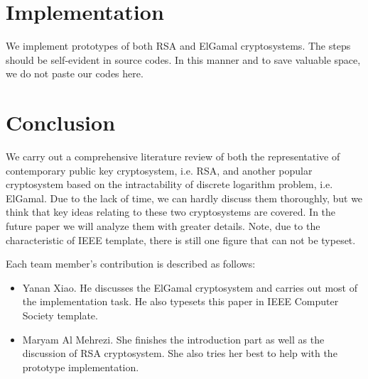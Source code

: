 \documentclass[12pt,journal,compsoc]{IEEEtran}
\begin{document}







\section{Implementation}
\label{sec:implementation}
We implement prototypes of both RSA and ElGamal cryptosystems. The
steps should be self-evident in source codes. In this manner and to
save valuable space, we do not paste our codes here.






\section{Conclusion}
We carry out a comprehensive literature review of both the
representative of contemporary public key cryptosystem, i.e. RSA, and
another popular cryptosystem based on the intractability of discrete
logarithm problem, i.e. ElGamal. Due to the lack of time, we can
hardly discuss them thoroughly, but we think that key ideas relating to
these two cryptosystems are covered. In the future paper we will
analyze them with greater details. Note, due to the characteristic of
IEEE template, there is still one figure that can not be typeset. 
\par
Each team member's contribution is described as follows:
\begin{itemize}
\item Yanan Xiao. He discusses the ElGamal cryptosystem and carries
  out most of the implementation task. He also typesets this paper in
  IEEE Computer Society template.
\item Maryam Al Mehrezi. She finishes the introduction part as well as
  the discussion of RSA cryptosystem. She also tries her best to help
  with the prototype implementation. 
\end{itemize}
\end{document}
